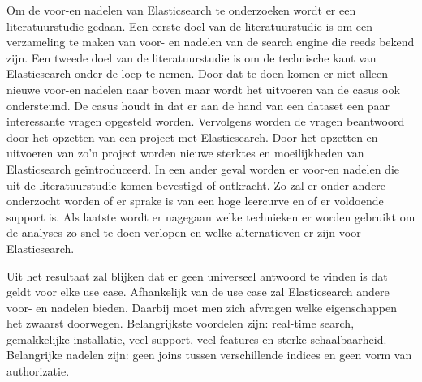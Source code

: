 Om de voor-en nadelen van Elasticsearch te onderzoeken wordt er een literatuurstudie gedaan. Een eerste doel van de literatuurstudie is om een verzameling te maken van voor- en nadelen van de search engine die reeds bekend zijn. Een tweede doel van de literatuurstudie is om de technische kant van Elasticsearch onder de loep te nemen. Door dat te doen komen er niet alleen nieuwe voor-en nadelen naar boven maar wordt het uitvoeren van de casus ook ondersteund. De casus houdt in dat er aan de hand van een dataset een paar interessante vragen
opgesteld worden. Vervolgens worden de vragen beantwoord door het opzetten van een project met Elasticsearch.
Door het opzetten en uitvoeren van zo'n project worden nieuwe sterktes en moeilijkheden van Elasticsearch geïntroduceerd. In een ander geval worden er voor-en nadelen die uit de literatuurstudie komen bevestigd of ontkracht. Zo zal er onder andere onderzocht worden of er sprake is van een hoge leercurve en of er voldoende support is. Als laatste wordt er nagegaan welke technieken er worden gebruikt om de analyses zo snel te doen verlopen en welke alternatieven er zijn voor Elasticsearch.

Uit het resultaat zal blijken dat er geen universeel antwoord te vinden is dat geldt voor elke use case. Afhankelijk van de use case zal Elasticsearch andere voor- en nadelen bieden. Daarbij moet men zich afvragen welke eigenschappen het zwaarst doorwegen. Belangrijkste voordelen zijn: real-time search, gemakkelijke installatie, veel support, veel features en sterke schaalbaarheid. Belangrijke nadelen zijn: geen joins tussen verschillende indices en geen vorm van authorizatie.

